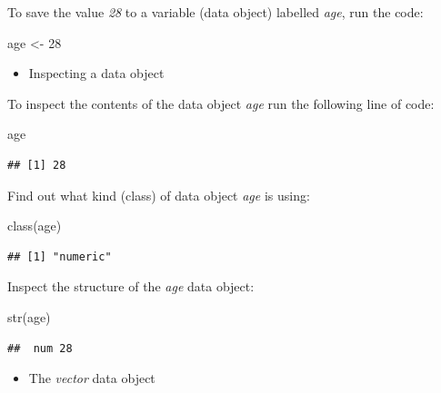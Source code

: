 \documentclass[
]{book}
\newenvironment{Shaded}{\begin{snugshade}}{\end{snugshade}}
\newcommand{\DecValTok}[1]{\textcolor[rgb]{0.00,0.00,0.81}{#1}}
\newcommand{\FunctionTok}[1]{\textcolor[rgb]{0.00,0.00,0.00}{#1}}
\newcommand{\NormalTok}[1]{#1}
\newcommand{\OtherTok}[1]{\textcolor[rgb]{0.56,0.35,0.01}{#1}}
\providecommand{\tightlist}{%
  \setlength{\itemsep}{0pt}\setlength{\parskip}{0pt}}
\begin{document}
To save the value \emph{28} to a variable (data object) labelled \emph{age}, run the code:

\begin{Shaded}
\begin{Highlighting}[]
\NormalTok{age }\OtherTok{\textless{}{-}} \DecValTok{28}
\end{Highlighting}
\end{Shaded}

\begin{itemize}
\tightlist
\item
  Inspecting a data object
\end{itemize}

To inspect the contents of the data object \emph{age} run the following line of code:

\begin{Shaded}
\begin{Highlighting}[]
\NormalTok{age}
\end{Highlighting}
\end{Shaded}

\begin{verbatim}
## [1] 28
\end{verbatim}

Find out what kind (class) of data object \emph{age} is using:

\begin{Shaded}
\begin{Highlighting}[]
\FunctionTok{class}\NormalTok{(age) }
\end{Highlighting}
\end{Shaded}

\begin{verbatim}
## [1] "numeric"
\end{verbatim}

Inspect the structure of the \emph{age} data object:

\begin{Shaded}
\begin{Highlighting}[]
\FunctionTok{str}\NormalTok{(age) }
\end{Highlighting}
\end{Shaded}

\begin{verbatim}
##  num 28
\end{verbatim}

\begin{itemize}
\tightlist
\item
  The \emph{vector} data object
\end{itemize}
\end{document}
